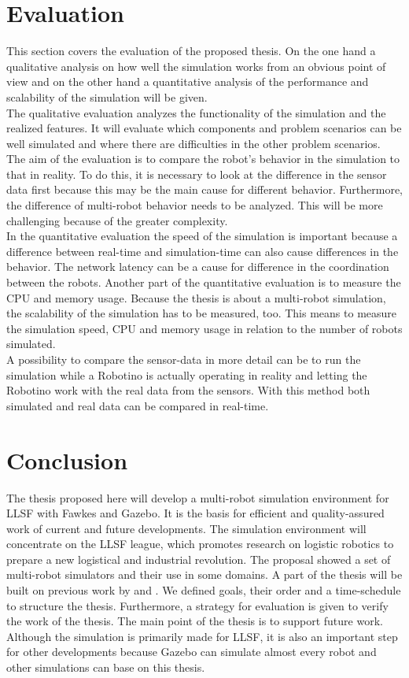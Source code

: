 \documentclass[11pt,a4paper,titlepage]{article}
\begin{document}
\section{Evaluation}
This section covers the evaluation of the proposed thesis. On the one hand a qualitative analysis on how well the simulation works from an obvious point of view and on the other hand a quantitative analysis of the performance and scalability of the simulation will be given.\\
The qualitative evaluation analyzes the functionality of the simulation and the realized features. It will evaluate which components and problem scenarios can be well simulated and where there are difficulties in the other problem scenarios. The aim of the evaluation is to compare the robot's behavior in the simulation to that in reality. To do this, it is necessary to look at the difference in the sensor data first because this may be the main cause for different behavior. Furthermore, the difference of multi-robot behavior needs to be analyzed. This will be more challenging because of the greater complexity.\\
In the quantitative evaluation the speed of the simulation is important because a difference between real-time and simulation-time can also cause differences in the behavior. The network latency can be a cause for difference in the coordination between the robots. Another part of the quantitative evaluation is to measure the CPU and memory usage. Because the thesis is about a multi-robot simulation, the scalability of the simulation has to be measured, too. This means to measure the simulation speed, CPU and memory usage in relation to the number of robots simulated.\\
A possibility to compare the sensor-data in more detail can be to run the simulation while a Robotino is actually operating in reality and letting the Robotino work with the real data from the sensors. With this method both simulated and real data can be compared in real-time.

\section{Conclusion}
The thesis proposed here will develop a multi-robot simulation environment for LLSF with Fawkes and Gazebo. It is the basis for efficient and quality-assured work of current and future developments. The simulation environment will concentrate on the LLSF league, which promotes research on logistic robotics to prepare a new logistical and industrial revolution. The proposal showed a set of multi-robot simulators and their use in some domains. A part of the thesis will be built on previous work by \cite{KlingenDA} and \cite{MultiLevelAbstraction}. We defined goals, their order and a time-schedule to structure the thesis. Furthermore, a strategy for evaluation is given to verify the work of the thesis. The main point of the thesis is to support future work. Although the simulation is primarily made for LLSF, it is also an important step for other developments because Gazebo can simulate almost every robot and other simulations can base on this thesis.




\end{document}
